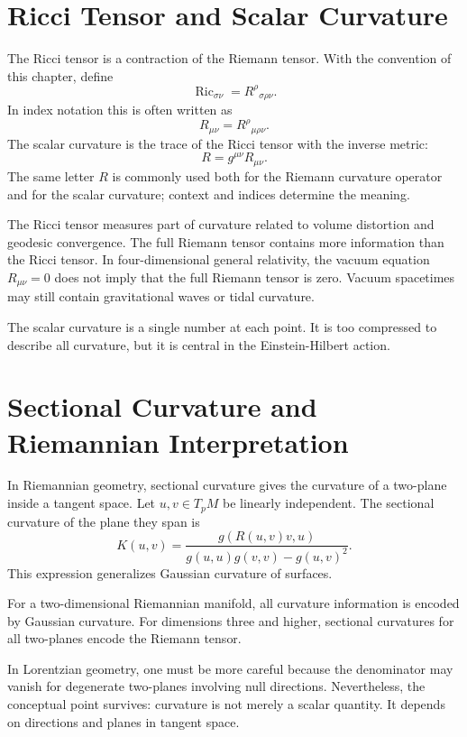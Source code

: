\clearpage

\section{Ricci Tensor and Scalar Curvature}

The Ricci tensor is a contraction of the Riemann tensor. With the convention of
this chapter, define
\[
\operatorname{Ric}_{\sigma\nu}=R^\rho{}_{\sigma\rho\nu}.
\]
In index notation this is often written as
\[
R_{\mu\nu}=R^\rho{}_{\mu\rho\nu}.
\]
The scalar curvature is the trace of the Ricci tensor with the inverse metric:
\[
R=g^{\mu\nu}R_{\mu\nu}.
\]
The same letter \(R\) is commonly used both for the Riemann curvature operator
and for the scalar curvature; context and indices determine the meaning.

The Ricci tensor measures part of curvature related to volume distortion and
geodesic convergence. The full Riemann tensor contains more information than the
Ricci tensor. In four-dimensional general relativity, the vacuum equation
\(R_{\mu\nu}=0\) does not imply that the full Riemann tensor is zero. Vacuum
spacetimes may still contain gravitational waves or tidal curvature.

The scalar curvature is a single number at each point. It is too compressed to
describe all curvature, but it is central in the Einstein-Hilbert action.

\clearpage

\section{Sectional Curvature and Riemannian Interpretation}

In Riemannian geometry, sectional curvature gives the curvature of a two-plane
inside a tangent space. Let \(u,v\in T_pM\) be linearly independent. The
sectional curvature of the plane they span is
\[
K(u,v)=
\frac{g(R(u,v)v,u)}{g(u,u)g(v,v)-g(u,v)^2}.
\]
This expression generalizes Gaussian curvature of surfaces.

For a two-dimensional Riemannian manifold, all curvature information is encoded
by Gaussian curvature. For dimensions three and higher, sectional curvatures for
all two-planes encode the Riemann tensor.

In Lorentzian geometry, one must be more careful because the denominator may
vanish for degenerate two-planes involving null directions. Nevertheless, the
conceptual point survives: curvature is not merely a scalar quantity. It depends
on directions and planes in tangent space.

